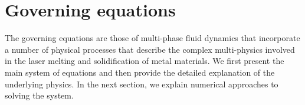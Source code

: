 \documentclass[final]{elsarticle} %
\begin{document}
\section{Governing equations}\label{sec:model}

The governing equations are those of multi-phase fluid dynamics that incorporate a number of physical processes that describe the complex multi-physics involved in the laser melting and solidification of metal materials. We first present the main system of equations and then provide the detailed explanation of the underlying physics. In the next section, we explain numerical approaches to solving the system.

\end{document}
